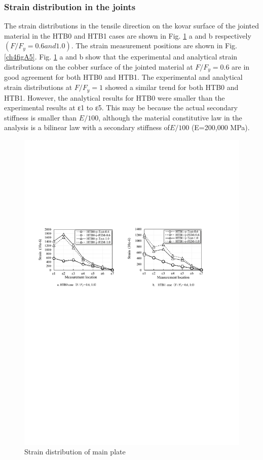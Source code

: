 \subsubsection{Strain distribution in the joints}

The strain distributions in the tensile direction on the kovar surface of the jointed material in the HTB0 and HTB1 cases are shown in Fig. \ref{ch4figA4} a and b respectively $(F / F_y = 0.6 and 1.0)$. The strain measurement positions are shown in Fig. \ref{ch4figA5}.
Fig. \ref{ch4figA4} a and b show that the experimental and analytical strain distributions on the cobber surface of the jointed material at $F / F_y = 0.6$ are in good agreement for both HTB0 and HTB1.
The experimental and analytical strain distributions at $F / F_y = 1$ showed a similar trend for both HTB0 and HTB1. However, the analytical results for HTB0 were smaller than the experimental results at ε1 to ε5. This may be because the actual secondary stiffness is smaller than $E/100$, although the material constitutive law in the analysis is a bilinear law with a secondary stiffness of$ E/100$ (E=200,000 MPa).

\begin{figure}[htbp]
    \centering
    \includegraphics[width=\textwidth]{imgs/ch4/figA4.pdf}
    \caption{Strain distribution of main plate}
    \label{ch4figA4}
\end{figure}

